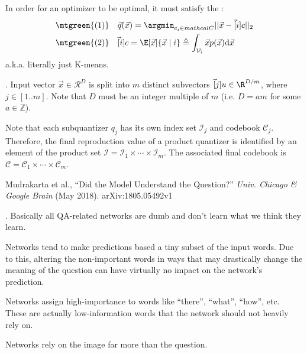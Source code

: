 \documentclass[11pt]{article}
\begin{document}
In order for an optimizer to be optimal, it must satisfy the :
\begin{align}
	\mtgreen{(1)}&
		\quad
		\vec q (\vec x) = \argmin_{c_i \in mathcal C} ||\vec x - \vec[i]{c}||_2 \\
	\mtgreen{(2)}&
		\quad
		\vec[i]{c} = \E[\vec x]{\vec x \mid i} \triangleq \int_{\mathcal V_i} \vec x p(\vec x) \mathrm{d} \vec x
\end{align}
a.k.a. literally just K-means. 

. Input vector $\vec x \in \mathcal R^D$ is split into $m$ distinct subvectors $\vec[j]{u} \in \R^{D/m}$, where $j \in [1..m]$. Note that $D$ must be an integer multiple of $m$ (i.e. $D = a m$ for some $a \in \mathbb Z$).

Note that each subquantizer $q_j$ has its own index set $\mathcal{I}_j$ and codebook $\mathcal C_j$. Therefore, the final reproduction value of a product quantizer is identified by an element of the product set $\mathcal I = \mathcal I_1 \times \cdots \times \mathcal I_m$. The associated final codebook is $\mathcal C = \mathcal C_1 \times \cdots \times \mathcal C_m$. 




\vspace{-1em}
{\footnotesize Mudrakarta et al., ``Did the Model Understand the Question?'' \textit{Univ. Chicago \& Google Brain} (May 2018).  arXiv:1805.05492v1}

. Basically all QA-related networks are dumb and don't learn what we think they learn. 
\begin{compactitem}
	\item Networks tend to make predictions based a tiny subset of the input words. Due to this, altering the non-important words in ways that may drastically change the meaning of the question can have virtually no impact on the network's prediction. 
	
	\item Networks assign high-importance to words like ``there'', ``what'', ``how'', etc. These are actually low-information words that the network should not heavily rely on.
	
	\item Networks rely on the image far more than the question.  
\end{compactitem}
\end{document}

